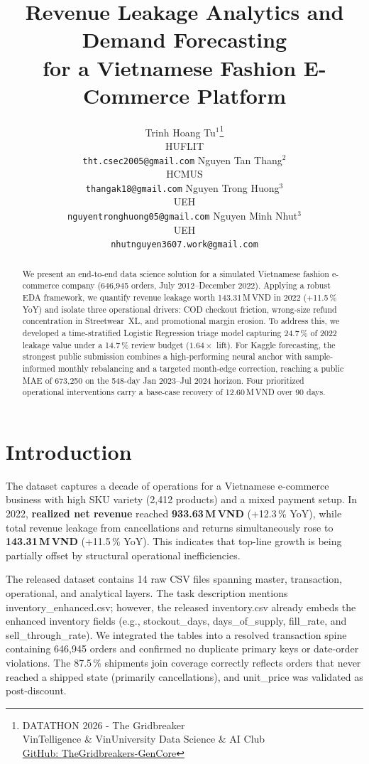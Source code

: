 \documentclass[10pt]{article}
\title{%
  Revenue Leakage Analytics and Demand Forecasting\\
  for a Vietnamese Fashion E-Commerce Platform
}
\author{
  Trinh Hoang Tu$^{1}$\thanks{%
      \small DATATHON 2026 - The Gridbreaker\\
      \small VinTelligence \& VinUniversity Data Science \& AI Club\\[4pt]
      \small \href{https://github.com/thtcsec/Datathon2026-TheGridbreakers-GenCore.git}{GitHub: TheGridbreakers-GenCore}%
  } \\
  HUFLIT \\
  \texttt{tht.csec2005@gmail.com}
  \And
  Nguyen Tan Thang$^{2}$ \\
  HCMUS \\
  \texttt{thangak18@gmail.com}
  \AND
  Nguyen Trong Huong$^{3}$ \\
  UEH \\
  \texttt{nguyentronghuong05@gmail.com}
  \And
  Nguyen Minh Nhut$^{3}$ \\
  UEH \\
  \texttt{nhutnguyen3607.work@gmail.com}
}
\begin{document}
\maketitle

\begin{abstract}
We present an end-to-end data science solution for a simulated Vietnamese fashion e-commerce company (646{,}945 orders, July 2012--December 2022). Applying a robust EDA framework, we quantify revenue leakage worth 143.31\,M\,VND in 2022 (+11.5\,\% YoY) and isolate three operational drivers: COD checkout friction, wrong-size refund concentration in Streetwear~XL, and promotional margin erosion. To address this, we developed a time-stratified Logistic Regression triage model capturing 24.7\,\% of 2022 leakage value under a 14.7\,\% review budget ($1.64\times$ lift). For Kaggle forecasting, the strongest public submission combines a high-performing neural anchor with sample-informed monthly rebalancing and a targeted month-edge correction, reaching a public MAE of 673{,}250 on the 548-day Jan 2023--Jul 2024 horizon. Four prioritized operational interventions carry a base-case recovery of 12.60\,M\,VND over 90 days.
\end{abstract}

\section{Introduction}
\label{sec:intro}

The dataset captures a decade of operations for a Vietnamese e-commerce business with high SKU variety (2,412 products) and a mixed payment setup. In 2022, \textbf{realized net revenue} reached \textbf{933.63\,M\,VND} (+12.3\,\% YoY), while total revenue leakage from cancellations and returns simultaneously rose to \textbf{143.31\,M\,VND} (+11.5\,\% YoY). This indicates that top-line growth is being partially offset by structural operational inefficiencies.

The released dataset contains 14 raw CSV files spanning master, transaction, operational, and analytical layers. The task description mentions inventory\_enhanced.csv; however, the released inventory.csv already embeds the enhanced inventory fields (e.g., stockout\_days, days\_of\_supply, fill\_rate, and sell\_through\_rate). We integrated the tables into a resolved transaction spine containing 646{,}945 orders and confirmed no duplicate primary keys or date-order violations. The 87.5\,\% shipments join coverage correctly reflects orders that never reached a shipped state (primarily cancellations), and unit\_price was validated as post-discount.
\end{document}
